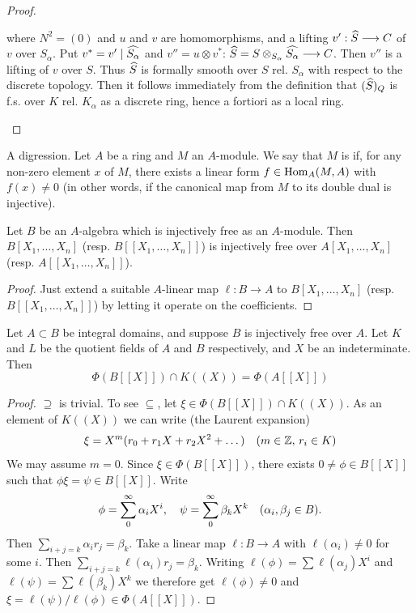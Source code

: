 \documentclass[../main]{subfiles}
\begin{document}
\begin{proof}
\begin{enumerate}[label = Step \Roman*.]
where $N^2 = (0)$ and $u$ and $v$ are homomorphisms, and a lifting $v' : \widehat{S} \longrightarrow C$ of $v$ over $S_\alpha$. Put $v^\ast = v' \mid \widehat{S_\alpha}$ and $v'' = u \otimes v^\ast$: $\widehat{S} = S \otimes_{S_\alpha} \widehat{S_\alpha} \longrightarrow C$. Then $v''$ is a lifting of $v$ over $S$. Thus $\widehat{S}$ is formally smooth over $S$ rel. $S_\alpha$ with respect to the discrete topology. Then it follows immediately from the definition that $(\widehat{S})_Q$ is f.s. over $K$ rel. $K_\alpha$ as a discrete ring, hence a fortiori as a local ring.
\end{enumerate}
\end{proof}

\newparagraph A digression. Let $A$ be a ring and $M$ an $A$-module. We say that $M$ is  if, for any non-zero element $x$ of $M$, there exists a linear form $f \in \operatorname{Hom}_A(M, A)$ with $f(x) \ne 0$ (in other words, if the canonical map from $M$ to its double dual is injective). 

\begin{lemma}
Let $B$ be an $A$-algebra which is injectively free as an $A$-module. Then $B[X_1, \ldots, X_n]$ (resp. $B[[X_1, \ldots, X_n]]$) is injectively free over $A[X_1, \ldots, X_n]$ (resp. $A[[X_1, \ldots, X_n]]$).
\end{lemma}

\begin{proof}
Just extend a suitable $A$-linear map $\ell : B \longrightarrow A$ to $B[X_1, \ldots, X_n]$ (resp. $B[[X_1, \ldots, X_n]]$) by letting it operate on the coefficients. 
\end{proof}

\begin{lemma}
Let $A \subset B$ be integral domains, and suppose $B$ is injectively free over $A$. Let $K$ and $L$ be the quotient fields of $A$ and $B$ respectively, and $X$ be an indeterminate. Then
\[
\Phi(B[[X]]) \cap K((X)) = \Phi(A[[X]])
\]
\end{lemma}

\begin{proof}
$\supseteq$ is trivial. To see $\subseteq$, let $\xi \in \Phi(B[[X]]) \cap K((X))$. As an element of $K((X))$ we can write (the Laurent expansion)
\[
\xi = X^m(r_0 + r_1 X + r_2 X^2 + \ldots)\for{ m \in \bZ, \, r_i \in K}
\]
We may assume $m = 0$. Since $\xi \in \Phi(B[[X]])$, there exists $0 \ne \phi \in B[[X]]$ such that $\phi \xi = \psi \in B[[X]]$. Write
\[
\phi = \sum_0^\infty \alpha_i X^i, \quad \psi = \sum_0^\infty \beta_k X^k \for{ \alpha_i, \beta_j \in B}.
\]
Then $\sum_{i + j = k} \alpha_i r_j = \beta_k$. Take a linear map $\ell : B \longrightarrow A$ with $\ell(\alpha_i) \ne 0$ for some $i$. Then $\sum_{i + j = k} \ell(\alpha_i) r_j = \beta_k$. Writing $\ell(\phi) = \sum \ell(\alpha_j) X^i$ and $\ell(\psi) = \sum \ell(\beta_k) X^k$ we therefore get $\ell(\phi) \ne 0$ and $\xi = \ell(\psi)/\ell(\phi) \in \Phi(A[[X]])$. 
\end{proof}
\end{document}
